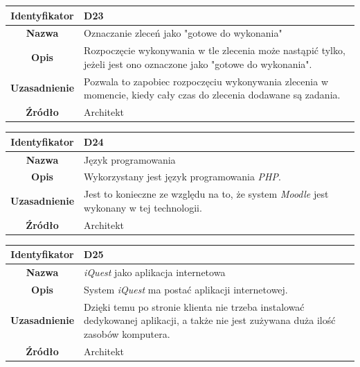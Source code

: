 \begin{table}[H]
\centering
\begin{tabular}{ | >{\bfseries}c | p{11cm} | }
\hline
%
Identyfikator & D23 \\ \hline
Nazwa &  Oznaczanie zleceń jako "gotowe do wykonania" \\ \hline
Opis & Rozpoczęcie wykonywania w tle zlecenia może nastąpić tylko, jeżeli jest ono oznaczone jako "gotowe do wykonania". \\ \hline
Uzasadnienie & Pozwala to zapobiec rozpoczęciu wykonywania zlecenia w momencie, kiedy cały czas do zlecenia dodawane są zadania. \\ \hline
Źródło & Architekt \\ \hline
%
\end{tabular}
\end{table}

\begin{table}[H]
\centering
\begin{tabular}{ | >{\bfseries}c | p{11cm} | }
\hline
%
Identyfikator & D24 \\ \hline
Nazwa & Język programowania \\ \hline
Opis & Wykorzystany jest język programowania \textit{PHP}. \\ \hline
Uzasadnienie & Jest to konieczne ze względu na to, że system \textit{Moodle} jest wykonany w tej technologii. \\ \hline
Źródło & Architekt \\ \hline
%
\end{tabular}
\end{table}

\begin{table}[H]
\centering
\begin{tabular}{ | >{\bfseries}c | p{11cm} | }
\hline
%
Identyfikator & D25 \\ \hline
Nazwa & \textit{iQuest} jako aplikacja internetowa \\ \hline
Opis & System \textit{iQuest} ma postać aplikacji internetowej. \\ \hline
Uzasadnienie & Dzięki temu po stronie klienta nie trzeba instalować dedykowanej aplikacji, a także nie jest zużywana duża ilość zasobów komputera. \\ \hline
Źródło & Architekt \\ \hline
%
\end{tabular}
\end{table}

